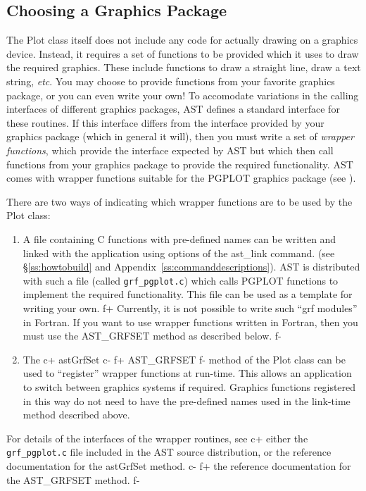 \documentclass[twoside,11pt]{starlink}
\providecommand{\appref}[1]{Appendix~\ref{#1}}
\providecommand{\secref}[1]{\S\ref{#1}}
\begin{document}
\subsection{\label{ss:choosingagraphicspackage}Choosing a Graphics Package}
The Plot class itself does not include any code for actually drawing on a
graphics device. Instead, it requires a set of functions to be provided
which it uses to draw the required graphics. These include functions
to draw a straight line, draw a text string, \emph{etc}. You may choose
to provide functions from your favorite graphics package, or you can even
write your own! To accomodate variations in the calling interfaces of
different graphics packages, AST defines a standard interface for these
routines. If this interface differs from the interface provided by your
graphics package (which in general it will), then you must write a set of
\emph{wrapper functions}, which provide the interface expected by AST but
which then call functions from your graphics package to provide the
required functionality. AST comes with wrapper functions suitable for
the PGPLOT graphics package (see ).

There are two ways of indicating which wrapper functions are to be used by
the Plot class:
\begin{enumerate}

\item A file containing C functions with pre-defined names can be written
and linked with the application using options of the ast\_link command.
(see \secref{ss:howtobuild} and \appref{ss:commanddescriptions}). AST is
distributed with such a file (called \texttt{grf\_pgplot.c}) which calls PGPLOT
functions to implement the required functionality. This file can be used
as a template for writing your own.
f+
Currently, it is not possible to write such ``grf modules'' in Fortran.
If you want to use wrapper functions written in Fortran, then you must
use the AST\_GRFSET method as described below.
f-

\item The
c+
astGrfSet
c-
f+
AST\_GRFSET
f-
method of the Plot class can be used to ``register''
wrapper functions at run-time. This allows an application to switch
between graphics systems if required. Graphics functions registered in
this way do not need to have the pre-defined names used in the link-time
method described above.

\end{enumerate}

For details of the interfaces of the wrapper routines, see
c+
either the \texttt{grf\_pgplot.c} file included in the AST source
distribution, or the reference documentation for the astGrfSet method.
c-
f+
the reference documentation for the AST\_GRFSET method.
f-
\end{document}
